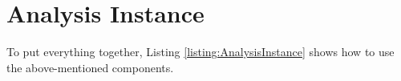 		\setJavaCodeListing
		

	\section{Analysis Instance}

		To put everything together, Listing \ref{listing:AnalysisInstance} shows how to use the above-mentioned components.

		\setJavaCodeListing
		